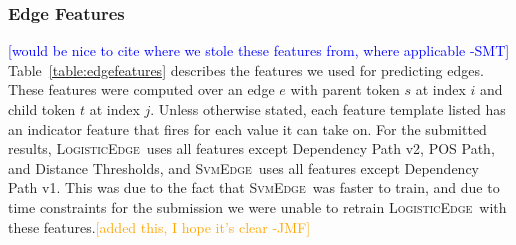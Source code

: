 \documentclass[11pt]{article}
\newcommand{\sam}[1]{\textcolor{blue}{[#1 -SMT]}}
\newcommand{\jmf}[1]{\textcolor{orange}{[#1 -JMF]}}
\newcommand{\logitedge}{\textsc{LogisticEdge}}
\newcommand{\svmedge}{\textsc{SvmEdge}}
\begin{document}
\subsubsection{Edge Features}
\label{s:edgefeatures}

\label{s:features}

\sam{would be nice to cite where we stole these features from, where applicable}
Table~\ref{table:edgefeatures} describes the features we used for predicting
edges.
These features were computed over an edge $e$ with parent token $s$ at
index $i$ and child token $t$ at index $j$. 
Unless otherwise stated, each feature template listed has an indicator
feature that fires for each value it can take on.  For the submitted results,
\logitedge~uses all features except Dependency Path v2, POS Path, and Distance
Thresholds, and \svmedge~uses all features except Dependency
Path v1.  This was due to the fact that \svmedge~was faster to
train, and due to time constraints for the submission we were unable to retrain
\logitedge~with these features.\jmf{added this, I hope it's clear}
\end{document}
